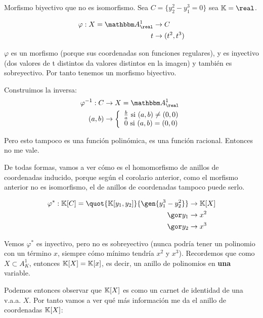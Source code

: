 \begin{example}
	Morfismo biyectivo que no es isomorfismo. Sea $C=\{y_2^2-y_1^3=0\}$ sea $\K=\real$.
	
	\begin{align*}
		\varphi: X=\A^1_ {\real} & \rightarrow C \\
		t & \rightarrow (t^2, t^3)
	\end{align*}
	
	$\varphi$ es un morfismo (porque sus coordenadas son funciones regulares), y es inyectivo (dos valores de t distintos da valores distintos en la imagen) y también es sobreyectivo. Por tanto tenemos un morfismo biyectivo.
	
	Construimos la inversa:
	\begin{align*}
		\varphi^{-1}: C & \rightarrow X=\A_{\real}^1 \\
		(a,b) & \rightarrow \left\{ \begin{array}{c}
			\frac{b}{a} \text{ si } (a,b)\neq(0,0)\\
			 0 \text{ si } (a,b)=(0,0)
		\end{array}\right.
	\end{align*}
	
	Pero esto tampoco es una función polinómica, es una función racional. Entonces no me vale. 
	
	De todas formas, vamos a ver cómo es el homomorfismo de anillos de coordenadas inducido, porque según el corolario anterior, como el morfismo anterior no es isomorfismo, el de anillos de coordenadas tampoco puede serlo.
	
	\begin{align*}
		\varphi^*: \K[C]= \quot{\K[y_1,y_2]}{\gen{y_1^3-y_2^2}} & \rightarrow \K[X] \\
		\cls{y_1} & \rightarrow x^2 \\
		\cls{y_2} & \rightarrow x^3
	\end{align*}
	
	Vemos $\varphi^*$ es inyectivo, pero no es sobreyectivo (nunca podría tener un polinomio con un término $x$, siempre cómo mínimo tendría $x^2$ y $x^3$). Recordemos que como $X \subset A_K^1$, entonces $\mathbb{K}[X]=\mathbb{K}[x]$, es decir, un anillo de polinomios en \textbf{una} variable.
\end{example}

Podemos entonces observar que $\mathbb{K}[X]$ es como un carnet de identidad de una v.a.a. $X$. Por tanto vamos a ver qué más información me da el anillo de coordenadas $\mathbb{K}[X]$:

